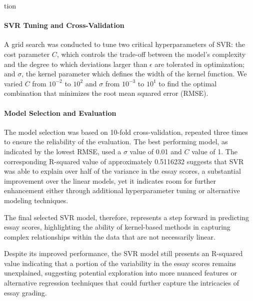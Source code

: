 tion\documentclass[8pt]{article}
\begin{document}
\begin{enumerate}
\paragraph{SVR Tuning and Cross-Validation}
A grid search was conducted to tune two critical hyperparameters of SVR: the cost parameter $C$, which controls the trade-off between the model's complexity and the degree to which deviations larger than $\epsilon$ are tolerated in optimization; and $\sigma$, the kernel parameter which defines the width of the kernel function. We varied $C$ from $10^{-2}$ to $10^{2}$ and $\sigma$ from $10^{-3}$ to $10^{1}$ to find the optimal combination that minimizes the root mean squared error (RMSE).

\paragraph{Model Selection and Evaluation}
The model selection was based on 10-fold cross-validation, repeated three times to ensure the reliability of the evaluation. The best performing model, as indicated by the lowest RMSE, used a $\sigma$ value of 0.01 and $C$ value of 1. The corresponding R-squared value of approximately 0.5116232 suggests that SVR was able to explain over half of the variance in the essay scores, a substantial improvement over the linear models, yet it indicates room for further enhancement either through additional hyperparameter tuning or alternative modeling techniques.

The final selected SVR model, therefore, represents a step forward in predicting essay scores, highlighting the ability of kernel-based methods in capturing complex relationships within the data that are not necessarily linear.

Despite its improved performance, the SVR model still presents an R-squared value indicating that a portion of the variability in the essay scores remains unexplained, suggesting potential exploration into more nuanced features or alternative regression techniques that could further capture the intricacies of essay grading.


\end{enumerate}
\end{document}
